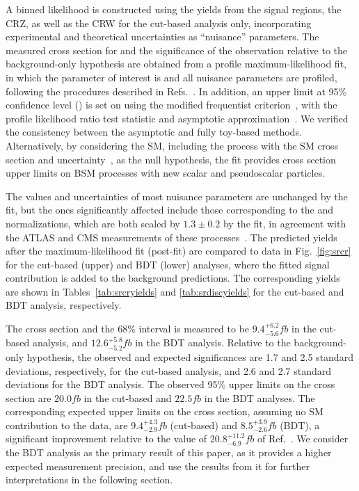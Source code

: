 A binned likelihood is constructed using the yields from the signal regions,
the CRZ, as well as the CRW for the cut-based analysis only, incorporating
experimental and theoretical uncertainties as ``nuisance'' parameters. 
The measured cross
section for \tttt and the significance of the observation relative to the
background-only hypothesis are obtained from a profile maximum-likelihood
fit, in which the parameter of interest is \xsectttt and all nuisance
parameters are profiled, following the procedures described in
Refs.~\cite{STAT:ATLPHYSPUB2011011,STAT:PDG}. In addition, an upper limit at 95\%
confidence level (\CL) is set on \xsectttt using the modified frequentist
\CLs criterion~\cite{STAT:Junk1999kv,STAT:Read2002hq}, with the profile likelihood
ratio test statistic and asymptotic approximation~\cite{STAT:Cowan2010js}. We
verified the consistency between the asymptotic and fully toy-based methods.
Alternatively, by considering the SM, including the \tttt process with the SM
cross section and uncertainty~\cite{THEORY:Frederix2017wme}, as the null
hypothesis, the fit provides cross section upper limits on BSM processes with
new scalar and pseudoscalar particles.

The values and uncertainties of most nuisance parameters are unchanged by the
fit, but the ones significantly affected include those corresponding to the
\ttW and \ttZ normalizations, which are both scaled by $1.3\pm0.2$ by the
fit, in agreement with the ATLAS and CMS measurements of these
processes~\cite{ATLAS:Aaboud2019njj, CMS:Sirunyan2017uzs, CMS:2019too}. The
predicted yields after the maximum-likelihood fit (post-fit) are compared to
data in Fig.~\ref{fig:srcr} for the cut-based (upper) and BDT (lower)
analyses, where the fitted \tttt signal contribution is added to the
background predictions. The corresponding yields are shown in
Tables~\ref{tab:srcryields} and \ref{tab:srdiscyields} for the cut-based and
BDT analysis, respectively.

The \tttt cross section and the 68\% \CL interval is measured to be
$9.4^{+6.2}_{-5.6}\unit{fb}$ in the cut-based analysis, and
$12.6^{+5.8}_{-5.2}\unit{fb}$ in the BDT analysis. Relative to the
background-only hypothesis, the observed and expected significances are 1.7
and 2.5 standard deviations, respectively, for the cut-based analysis, and
2.6 and 2.7 standard deviations for the BDT analysis. The observed 95\% \CL
upper limits on the cross section are $20.0\unit{fb}$ in the cut-based and
$22.5\unit{fb}$ in the BDT analyses. The corresponding expected upper limits
on the \tttt cross section, assuming no SM \tttt contribution to the data,
are $9.4^{+4.3}_{-2.9}\unit{fb}$ (cut-based) and $8.5^{+3.9}_{-2.6}\unit{fb}$
(BDT), a significant improvement relative to the value of
$20.8^{+11.2}_{-6.9}\unit{fb}$ of Ref.~\cite{CMS:myTOP2016}. We consider the BDT
analysis as the primary result of this paper, as it provides a higher
expected measurement precision, and use the results from it for further
interpretations in the following section.




